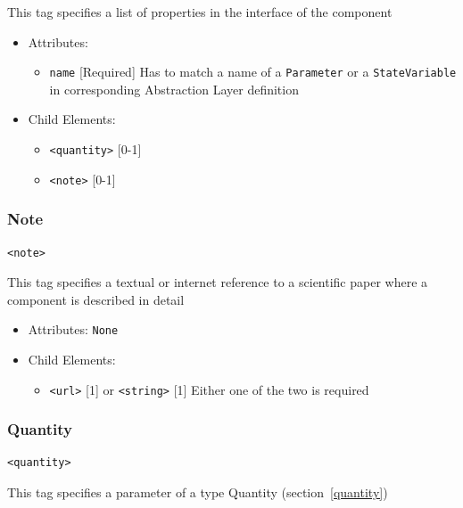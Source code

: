 \documentclass[draftspec]{ninemlspec}
\begin{document}
This tag specifies a list of properties in the interface of the component

\begin{itemize}
\item Attributes:
%
\begin{itemize}
\item \verb|name| {[}Required{]} Has to match a name of a {\tt Parameter}
or a {\tt StateVariable} in corresponding Abstraction Layer definition
\end{itemize}

\item Child Elements:
%
\begin{itemize}
\item \verb|<quantity>| {[}0-1{]}
\item \verb|<note>| {[}0-1{]}
\end{itemize}

\end{itemize}

\subsubsection{Note}
%
\begin{lstlisting}
<note>
\end{lstlisting}

This tag specifies a textual or internet reference to a scientific paper where
a component is described in detail

\begin{itemize}
\item Attributes: \texttt{None}

\item Child Elements:
%
\begin{itemize}
\item \verb|<url>| {[}1{]} or \verb|<string>| {[}1{]} Either one
of the two is required
\end{itemize}

\end{itemize}

\subsubsection{Quantity}
%
\begin{lstlisting}
<quantity>
\end{lstlisting}

This tag specifies a parameter of a type Quantity (section~\ref{quantity})
\end{document}
